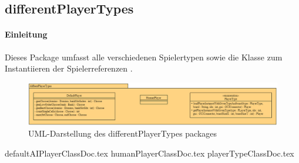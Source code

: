 \subsection{differentPlayerTypes}
\label{ss:differentPlayerTypes}
\FloatBarrier

\paragraph{Einleitung}
Dieses Package umfasst alle verschiedenen Spielertypen sowie die Klasse zum Instantiieren der Spielerreferenzen . 

\begin{figure}
	\centering
	\includegraphics[width=\linewidth]{pics/differentPlayerTypesPackage}
	\caption{UML-Darstellung des differentPlayerTypes packages}
	\label{fig:differentPlayerTypesPackage}
\end{figure}

{defaultAIPlayerClassDoc.tex}
{humanPlayerClassDoc.tex}
{playerTypeClassDoc.tex}